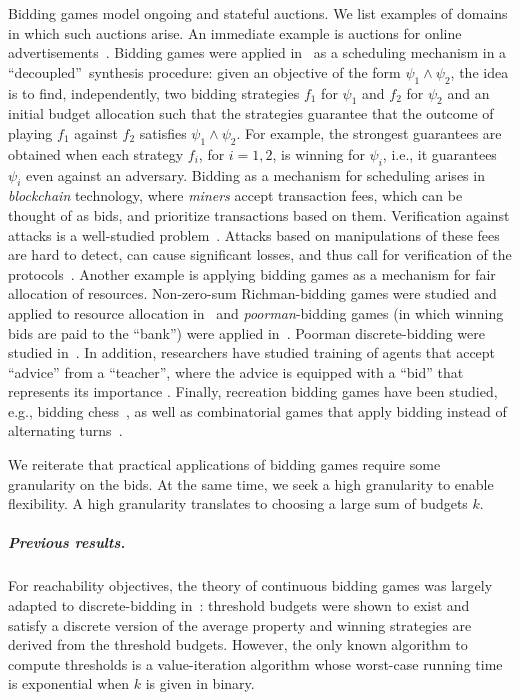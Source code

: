 \documentclass{article}\providecommand{\nequiv}{\not\equiv}\usepackage[a4paper,margin=20mm]{geometry}
\begin{document}
Bidding games model ongoing and stateful auctions. We list examples of domains in which such auctions arise. An immediate example is auctions for online advertisements~\cite{Mut09}. 
Bidding games were applied in~\cite{AMS24} as a scheduling mechanism in a ``decoupled''~synthesis procedure: given an objective of the form $\psi_1 \wedge \psi_2$, the idea is to find, independently, two bidding strategies $f_1$ for $\psi_1$ and $f_2$ for $\psi_2$  and an initial budget allocation such that the strategies guarantee that the outcome of playing $f_1$ against $f_2$ satisfies $\psi_1 \wedge \psi_2$. For example, the strongest guarantees are obtained when each strategy $f_i$, for $i =1,2$, is winning for $\psi_i$, i.e., it guarantees $\psi_i$ even against an adversary. 
Bidding as a mechanism for scheduling arises in {\em blockchain} technology, where {\em miners} accept transaction fees, which can be thought of as bids, and prioritize transactions based on them. Verification against attacks is a well-studied problem~\cite{CGV18,ABC16}. Attacks based on manipulations of these fees are hard to detect, can cause significant losses, and thus call for verification of the protocols~\cite{CGV18,ABC16}. 
Another example is applying bidding games as a mechanism for fair allocation of resources. Non-zero-sum Richman-bidding games were studied and applied to resource allocation in~\cite{MKT18} and {\em poorman}-bidding games (in which winning bids are paid to the ``bank'') were applied in~\cite{BEF21}. Poorman discrete-bidding were studied in~\cite{AM+23}.
In addition, researchers have studied training of agents that accept ``advice'' from a ``teacher'', where the advice is equipped with a ``bid'' that represents its importance \cite{AK+16}.
Finally, recreation bidding games have been studied, e.g., bidding chess~\cite{BP09}, as well as combinatorial games that apply bidding instead of alternating turns~\cite{RLP21}. 

We reiterate that practical applications of bidding games require some granularity on the bids. At the same time, we seek a high granularity to enable flexibility. A high granularity translates to  choosing a large sum of budgets $k$.

\subparagraph*{Previous results.}
For reachability objectives, the theory of continuous bidding games was largely adapted to discrete-bidding in~\cite{DP10}: threshold budgets were shown to exist and satisfy a discrete version of the average property and  winning strategies are derived from the threshold budgets. However, the only known algorithm to compute thresholds is a value-iteration algorithm whose worst-case running time is exponential when $k$ is given in binary.
\end{document}

